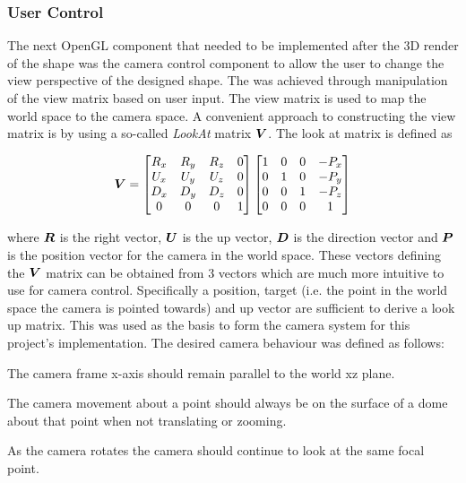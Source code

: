 \subsubsection{User Control}

The next OpenGL component that needed to be implemented after the 3D render of the shape was the camera control component to allow the user to change the view perspective of the designed shape. The was achieved through manipulation of the view matrix based on user input. The view matrix is used to map the world space to the camera space. A convenient approach to constructing the view matrix is by using a so-called \textit{LookAt} matrix $\bm{V}$. The look at matrix is defined as

\begin{align}
	\bm{V}=
	\begin{bmatrix}
		R_x & R_y & R_z & 0 \\
		U_x & U_y & U_z & 0 \\
		D_x & D_y & D_z & 0 \\
		0 & 0 & 0 & 1 \\
	\end{bmatrix}
	\begin{bmatrix}
		1 & 0 & 0 & -P_x \\
		0 & 1 & 0 & -P_y \\
		0 & 0 & 1 & -P_z \\
		0 & 0 & 0 & 1 \\
	\end{bmatrix}
\end{align}

where $\bm{R}$ is the right vector, $\bm{U}$ is the up vector, $\bm{D}$ is the direction vector and $\bm{P}$ is the position vector for the camera in the world space. These vectors defining the $\bm{V}$ matrix can be obtained from 3 vectors which are much more intuitive to use for camera control. Specifically a position, target (i.e. the point in the world space the camera is pointed towards) and up vector are sufficient to derive a look up matrix. This was used as the basis to form the camera system for this project's implementation. The desired camera behaviour was defined as follows:

\begin{compactitem}
	\item The camera frame x-axis should remain parallel to the world xz plane.
	\item The camera movement about a point should always be on the surface of a dome about that point when not translating or zooming.
	\item As the camera rotates the camera should continue to look at the same focal point.
\end{compactitem}

